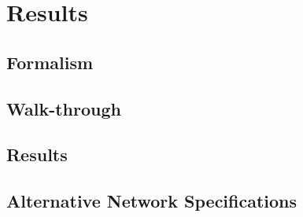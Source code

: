 \chapter{Results}
\label{chap:results}

\section{Formalism}
\section{Walk-through}
\section{Results}
\section{Alternative Network Specifications}
